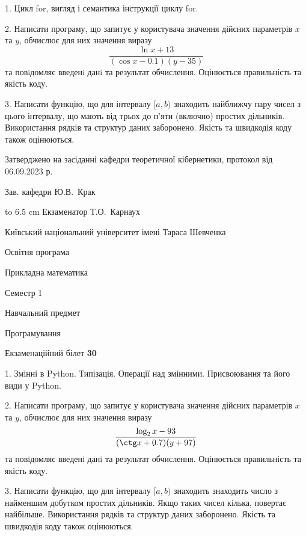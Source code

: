 \documentclass[12pt, ukrainian]{article}
\begin{document}
{%
1. Цикл for, вигляд і семантика інструкції циклу for.%
\par
2. Написати програму, що запитує у користувача значення дійсних параметрів $x$ та $y$, обчислює для них значення виразу 
$$\frac{\ln x + 13}{(\cos x - 0.1) (y - 35)}$$ 
та повiдомляє введенi данi та результат обчислення.
 Оцінюється правильність та якість коду.

\par
3. Написати функцію, що для інтервалу $[a, b)$ знаходить найближчу пару чисел з цього інтервалу, що мають від трьох до п'яти (включно) простих дільників.  Використання рядків та структур даних заборонено. Якість та швидкодія коду також оцінюються. 

}
{\smallskip\smallskip \begin {scriptsize} Затверджено на засіданні кафедри теоретичної кібернетики, протокол   від   06.09.2023 р.\par\smallskip\smallskip\smallskip\smallskip
{\parbox {6.5 cm} {Зав. кафедри \dotfill Ю.В.~Крак}}\hspace {0.7cm} {\hbox to 6.5 cm { Екзаменатор \dotfill Т.О.~Карнаух}} \end{scriptsize}}
\vspace{0.9cm}
{{\begin {scriptsize}\par
{ \center  Київський національний університет імені Тараса Шевченка \par}
{\parbox {5 cm}{Освітня програма \hfill}{\parbox {7 cm}{Прикладна математика\hfill}}\parbox {6 cm}{\hfill Семестр 1}}\par
{\parbox {5 cm} {Навчальний предмет \hfill}\parbox {7 cm}{Програмування \hfill}\parbox {6cm}{\hfill}\par}\vspace{-15pt} \end{scriptsize}}{\center Екзаменаційний білет \No \textbf { 30 }\par}}
{%
1. Змінні в Python. Типізація. Операції над змінними. Присвоювання та його види у Python.%
\par
2. Написати програму, що запитує у користувача значення дійсних параметрів $x$ та $y$, обчислює для них значення виразу 
$$\frac{\log_{2} x - 93}{(\ctg x + 0.7) (y + 97)}$$ 
та повiдомляє введенi данi та результат обчислення.
 Оцінюється правильність та якість коду.

\par
3. Написати функцію, що для інтервалу $[a, b)$ знаходить знаходить число з найменшим добутком простих дільників. Якщо таких чисел кілька, повертає найбільше.  Використання рядків та структур даних заборонено. Якість та швидкодія коду також оцінюються. 

}
\end{document}
